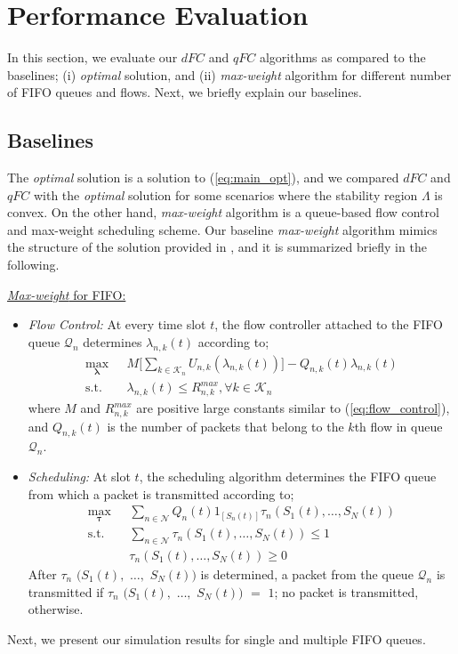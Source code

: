\documentclass[conference]{IEEEtran}
\newcommand{\Kset}{\mathcal{K}}
\newcommand{\Nset}{\mathcal{N}}
\newcommand{\Qset}{\mathcal{Q}}
\begin{document}
\section{Performance Evaluation}\label{sec:performance}
In this section, we evaluate our $dFC$ and $qFC$ algorithms as compared to the baselines; (i) {\em optimal} solution, and (ii) {\em max-weight} algorithm for different number of FIFO queues and flows. Next, we briefly explain our baselines. 

\subsection{Baselines}
The {\em optimal} solution is a solution to (\ref{eq:main_opt}), and we compared $dFC$ and $qFC$ with the {\em optimal} solution for some scenarios where the stability region $\Lambda$ is convex. On the other hand, {\em max-weight} algorithm is a queue-based flow control and max-weight scheduling scheme. Our baseline {\em max-weight} algorithm mimics the structure of the solution provided in \cite{neely_mod}, and it is summarized briefly in the following. 

\underline{{\em Max-weight} for FIFO:}
\begin{itemize} 
\item {\em Flow Control:} At every time slot $t$, the flow controller attached to the FIFO queue $\Qset_{n}$ determines $\lambda_{n,k}(t)$ according to;
\begin{align} \label{eq:flow_control_mw}
\max_{\boldsymbol \lambda} \mbox{ } &  M  \bigl[\sum_{k \in \Kset_{n}} U_{n,k}(\lambda_{n,k}(t)) \bigr] - Q_{n,k}(t)\lambda_{n,k}(t) \nonumber \\
\mbox{s.t.} \mbox{ }  &  \lambda_{n,k}(t) \leq R_{n,k}^{max}, \forall k \in \Kset_{n}
\end{align} where $M$ and $R_{n,k}^{max}$ are positive large constants similar to (\ref{eq:flow_control}), and $Q_{n,k}(t)$ is the number of packets that belong to the $k$th flow in queue $\Qset_{n}$. 
\item {\em Scheduling:} At slot $t$, the scheduling algorithm determines the FIFO queue from which a packet is transmitted according to; 
\begin{align} \label{eq:scheduling_mw}
\max_{\boldsymbol \tau} \mbox{ } &  \sum_{n \in \Nset} Q_{n}(t) 1_{[S_{n}(t)]} \tau_{n}(S_1(t), \ldots, S_N(t)) \nonumber \\
\mbox{s.t.} \mbox{ }  &  \sum_{n \in \Nset} \tau_{n} (S_1(t), \ldots, S_N(t)) \leq 1 \nonumber \\
& \tau_{n} (S_1(t), \ldots, S_N(t)) \geq 0
\end{align} After $\tau_{n}$ $(S_1(t),$ $\ldots,$ $S_N(t)) $ is determined, a packet from the queue $\Qset_{n}$ is transmitted if $\tau_{n}$ $(S_1(t),$ $\ldots,$ $S_N(t))$ $=$ $1$; no packet is transmitted, otherwise. 
\end{itemize}
Next, we present our simulation results for single and multiple FIFO queues. 
\end{document}
